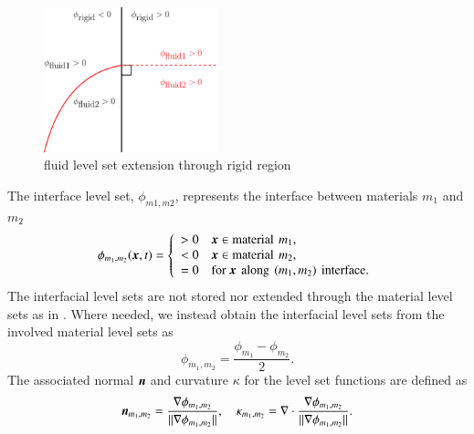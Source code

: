 \documentclass[preprint,12pt]{Definitions/elsarticle}
\newcommand{\tn}{\textnormal}
\newcommand{\bmx}{\mbox{\boldmath $x$\unboldmath}}
\newcommand{\bmn}{\mbox{\boldmath $n$\unboldmath}}
\begin{document}
\begin{figure}[htbp]
	\centering
	\includegraphics[width=0.45\textwidth]{LSextend.eps}
	\caption{fluid level set extension through rigid region}
	\label{fig:LSextend}
\end{figure}

\noindent The interface level set, $\phi_{m1,m2}$,
represents the interface between materials
$m_1$ and $m_2$
\begin{equation}
\phi_{m_1,m_2}(\bmx,t) = \left\{
\begin{array}{ll}
> 0 & \bmx \in \tn{material}\,\: m_1, \\ 
< 0 & \bmx \in \tn{material}\,\: m_2, \\ 
= 0 & \tn{for }\bmx\,\: \tn{along}\,\:(m_1,m_2)\,\:\tn{interface}. \\ 
\end{array}
\right.
\end{equation}
The interfacial level sets are not stored nor extended through the material level sets as in \cite{yeETAL2023CMOF}. Where needed, we instead obtain the interfacial level sets from the involved material level sets as
\begin{equation}
\phi_{m_1,m_2} = \frac{\phi_{m_1}-\phi_{m_2}}{2}.
\end{equation}
The associated normal $\bmn$ and curvature $\kappa$ for the level set functions are defined as
\begin{equation}
\bmn_{m_1,m_2} = 
\frac{\nabla \phi_{m_1,m_2}}{||\nabla \phi_{m_1,m_2}||}, \hspace{10pt}   
\kappa_{m_1,m_2} = 
\nabla \cdot \frac{\nabla \phi_{m_1,m_2}}{||\nabla \phi_{m_1,m_2}||}.
\end{equation}
\end{document}
